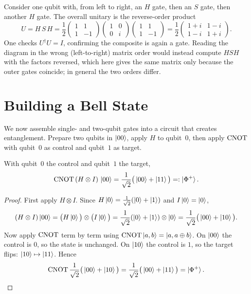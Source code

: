 \begin{example}
Consider one qubit with, from left to right, an $H$ gate, then an $S$ gate, then
another $H$ gate. The overall unitary is the reverse-order product
\[
  U = H\,S\,H
    = \frac{1}{2}\begin{pmatrix}1&1\\1&-1\end{pmatrix}
      \begin{pmatrix}1&0\\0&i\end{pmatrix}
      \begin{pmatrix}1&1\\1&-1\end{pmatrix}
    = \frac{1}{2}\begin{pmatrix}1+i&1-i\\1-i&1+i\end{pmatrix}.
\]
One checks $U^{\dagger}U=I$, confirming the composite is again a gate. Reading
the diagram in the wrong (left-to-right) matrix order would instead compute
$HSH$ with the factors reversed, which here gives the same matrix only because
the outer gates coincide; in general the two orders differ.
\end{example}

\section{Building a Bell State}

We now assemble single- and two-qubit gates into a circuit that creates
entanglement. Prepare two qubits in $\ket{00}$, apply $H$ to qubit~$0$, then
apply $\mathrm{CNOT}$ with qubit~$0$ as control and qubit~$1$ as target.

\begin{theorem}
\label{l2:thm:bell}
With qubit~$0$ the control and qubit~$1$ the target,
\[
  \mathrm{CNOT}\,(H\otimes I)\,\ket{00}
    = \frac{1}{\sqrt2}\big(\ket{00}+\ket{11}\big)
    =: \ket{\Phi^{+}}.
\]
\end{theorem}

\begin{proof}
First apply $H\otimes I$. Since $H\ket{0}=\tfrac{1}{\sqrt2}(\ket{0}+\ket{1})$
and $I\ket{0}=\ket{0}$,
\[
  (H\otimes I)\ket{00}
    = \big(H\ket{0}\big)\otimes\big(I\ket{0}\big)
    = \frac{1}{\sqrt2}(\ket{0}+\ket{1})\otimes\ket{0}
    = \frac{1}{\sqrt2}\big(\ket{00}+\ket{10}\big).
\]
Now apply $\mathrm{CNOT}$ term by term using $\mathrm{CNOT}\ket{a,b}=\ket{a,a\oplus b}$. On
$\ket{00}$ the control is $0$, so the state is unchanged. On $\ket{10}$ the
control is $1$, so the target flips: $\ket{10}\mapsto\ket{11}$. Hence
\[
  \mathrm{CNOT}\,\frac{1}{\sqrt2}\big(\ket{00}+\ket{10}\big)
    = \frac{1}{\sqrt2}\big(\ket{00}+\ket{11}\big)=\ket{\Phi^{+}}. \qedhere
\]
\end{proof}

